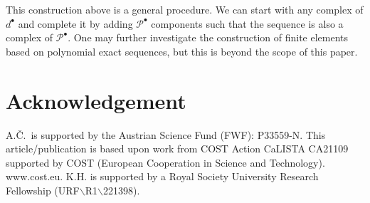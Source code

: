 \documentclass[11pt]{amsart}
\newcommand{\0}{\mathaccent23}
\newcommand{\bs}{{\scriptscriptstyle \bullet}}
\begin{document}
This construction above is a general procedure. We can start with any complex of $d^{\bs}$ and complete it by adding $\mathscr{P}^{\bs}$ components such that the sequence is also a complex of $\mathscr{P}^{\bs}$. %
One may further investigate the construction of finite elements based on polynomial exact sequences, but this is beyond the scope of this paper. 




\section*{Acknowledgement}

A.\v C.\ is supported by the Austrian Science Fund (FWF): P33559-N. {This article/publication is based upon work from COST Action 
CaLISTA CA21109 supported by COST (European Cooperation in Science and Technology). www.cost.eu.} K.H. is supported by a Royal Society University Research Fellowship (URF$\backslash${\rm R}1$\backslash$221398).






{}   %
\end{document}
